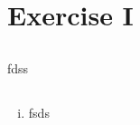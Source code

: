 \documentclass[12pt,twoside]{article}
\begin{document}



\section{Exercise I}
\renewcommand{\thesubsection}{\thesection.\alph{subsection}}
\subsection{}
fdss
\subsection{}
\begin{enumerate}[(ii)]
\item
fsds
\end{enumerate}
\end{document}
